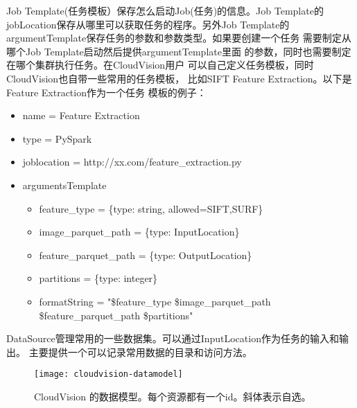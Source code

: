 Job Template(任务模板）保存怎么启动Job(任务)的信息。Job Template的
jobLocation保存从哪里可以获取任务的程序。另外Job Template的
argumentTemplate保存任务的参数和参数类型。如果要创建一个任务
需要制定从哪个Job Template启动然后提供argumentTemplate里面
的参数，同时也需要制定在哪个集群执行任务。在CloudVision用户
可以自己定义任务模板，同时CloudVision也自带一些常用的任务模板，
比如SIFT Feature Extraction。以下是Feature Extraction作为一个任务
模板的例子：
\begin{itemize}
  \item name = Feature Extraction
  \item type = PySpark
  \item joblocation = http://xx.com/feature\_extraction.py
  \item argumentsTemplate
        \begin{itemize}
            \item feature\_type = \{type: string, allowed=SIFT,SURF\}
            \item image\_parquet\_path = \{type: InputLocation\}
            \item feature\_parquet\_path = \{type: OutputLocation\}
            \item  partitions = \{type: integer\}
            \item  formatString = "\$feature\_type \$image\_parquet\_path \$feature\_parquet\_path \$partitions"
        \end{itemize}
\end{itemize}


DataSource管理常用的一些数据集。可以通过InputLocation作为任务的输入和输出。
主要提供一个可以记录常用数据的目录和访问方法。

\begin{figure}[h]
  \centering
    \texttt{[image: cloudvision-datamodel]}
  \caption{CloudVision 的数据模型。每个资源都有一个id。斜体表示自选。}
  \label{fig:cloudvision-datamodel}
\end{figure}

